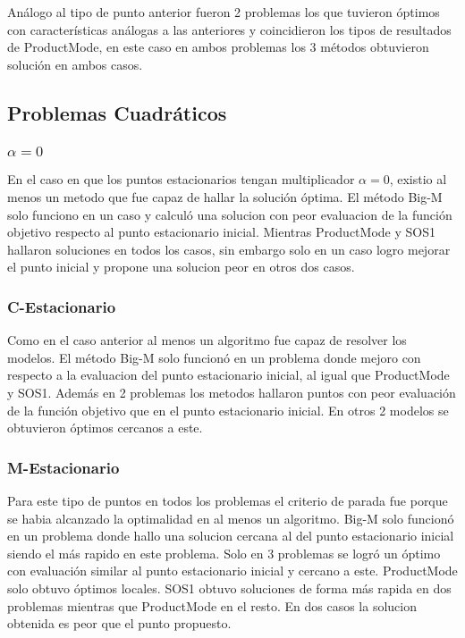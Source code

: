 Análogo al tipo de punto anterior  fueron 2 problemas los que tuvieron óptimos con características análogas a las anteriores y coincidieron los tipos de resultados de ProductMode, en este caso en ambos problemas los 3 métodos obtuvieron solución en ambos casos. 
   



\subsection{Problemas Cuadráticos}


\subsubsection{$\alpha =0$}
En el caso en que los puntos estacionarios tengan multiplicador $\alpha=0$, existio al menos un metodo que fue capaz de hallar la soluci\'on óptima. El método Big-M solo funciono en un caso y calculó una solucion con peor evaluacion de la función objetivo respecto al punto estacionario inicial. Mientras ProductMode y SOS1 hallaron soluciones en todos los casos, sin embargo solo en un caso logro mejorar el punto inicial y propone una solucion peor en otros dos casos. 

\subsubsection{C-Estacionario}   
Como en  el caso anterior al menos un algoritmo fue capaz de resolver los modelos. 
El método Big-M solo funcionó en un problema donde mejoro con respecto a la evaluacion del punto estacionario inicial, al igual que  ProductMode y SOS1. Además en 2 problemas los metodos hallaron puntos con peor evaluación de la función objetivo que en el punto estacionario inicial. En otros 2 modelos se obtuvieron óptimos cercanos a este.



    
\subsubsection{M-Estacionario}
  
Para este tipo de puntos en todos los problemas el criterio de parada fue porque se habia alcanzado la optimalidad en al menos un algoritmo.
Big-M solo funcionó en un problema donde hallo una solucion cercana al del punto estacionario inicial siendo el más rapido en este problema. Solo en 3 problemas  se logró  un óptimo con evaluación  similar al punto estacionario inicial  y   cercano a este. ProductMode solo obtuvo óptimos locales. SOS1 obtuvo soluciones de forma más rapida en dos problemas mientras que ProductMode en el resto. En dos casos la solucion obtenida es peor que el punto propuesto.
    
